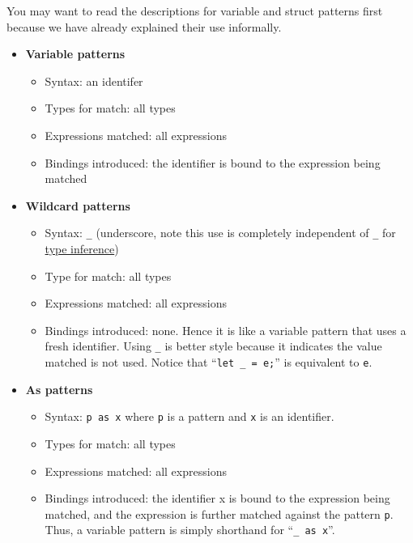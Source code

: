 You may want to read the descriptions for variable and struct patterns
first because we have already explained their use informally.

\begin{itemize}
\item \textbf{Variable patterns}
  \begin{itemize}
  \item Syntax: an identifer
  \item Types for match: all types
  \item Expressions matched: all expressions
  \item Bindings introduced: the identifier is bound to the expression
    being matched
  \end{itemize}
\item \hypertarget{wild_pat}{\textbf{Wildcard patterns}}
  \begin{itemize}
  \item Syntax: \texttt{_} (underscore, note this use is completely
    independent of \texttt{_} for \hyperlink{type_inference_sec}{type
      inference})
  \item Type for match: all types
  \item Expressions matched: all expressions
  \item Bindings introduced: none.  Hence it is like a
      variable pattern that uses a fresh identifier.  Using \texttt{_}
      is better style because it indicates the value matched is not
      used.  Notice that ``\texttt{let _ = e;}'' is equivalent to
      \texttt{e}.
  \end{itemize}
  
\item \textbf{As patterns}
  \begin{itemize}
  \item Syntax: \texttt{p as x} where \texttt{p} is a pattern and \texttt{x}
    is an identifier.
  \item Types for match: all types
  \item Expressions matched: all expressions
  \item Bindings introduced: the identifier x is bound to the expression
    being matched, and the expression is further matched against the
    pattern \texttt{p}.  Thus, a variable pattern is simply shorthand
    for ``\texttt{_ as x}''.
  \end{itemize}


\end{itemize}
